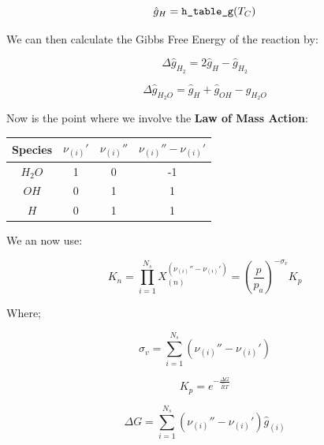 \documentclass[12pt, Times New Roman]{article}
\begin{document}
    \begin{equation}
        \hat{g}_{H} = \verb|h_table_g|(T_{C})
    \end{equation}

    \vspace*{6pt}

    We can then calculate the Gibbs Free Energy of the reaction by:

    \begin{equation}
        \Delta \hat{g}_{H_{2}} = 2\hat{g}_{H} - \hat{g}_{H_{2}}
    \end{equation}

    \begin{equation}
        \Delta \hat{g}_{H_{2}O} = \hat{g}_{H} + \hat{g}_{OH} - \hat{g}_{H_{2}O}
    \end{equation}

    Now is the point where we involve the \textbf{Law of Mass Action}:

    \begin{center}
        \begin{tabular}{|c|c|c|c|}
            \hline
            Species & $\nu_{(i)} '$ & $\nu_{(i)} ''$ & $\nu_{(i)} '' - \nu_{(i)} '$ \\
            \hline
            $H_{2}O$ & 1 & 0 & -1 \\
            \hline
            $OH$ & 0 & 1 & 1 \\
            \hline
            $H$ & 0 & 1 & 1 \\
            \hline
        \end{tabular}
    \end{center}

    We an now use:

    \begin{equation}
        K_{n} = \prod^{N_{s}}_{i=1} X_{(n)}^{(\nu_{(i)} '' - \nu_{(i)} ')} = (\frac{p}{p_{a}})^{-\sigma_{v}}K_{p}
    \end{equation}

    Where;

    \begin{equation}
        \sigma_{v} = \sum^{N_{s}}_{i=1} (\nu_{(i)} '' - \nu_{(i)} ')
    \end{equation}

    \begin{equation}
        K_{p} = e^{- \frac{\Delta G}{\hat{R}T}}
    \end{equation}

    \begin{equation}
        \Delta G = \sum^{N_{s}}_{i=1} (\nu_{(i)} '' - \nu_{(i)} ') \hat{g}_{(i)}
    \end{equation}
\end{document}
